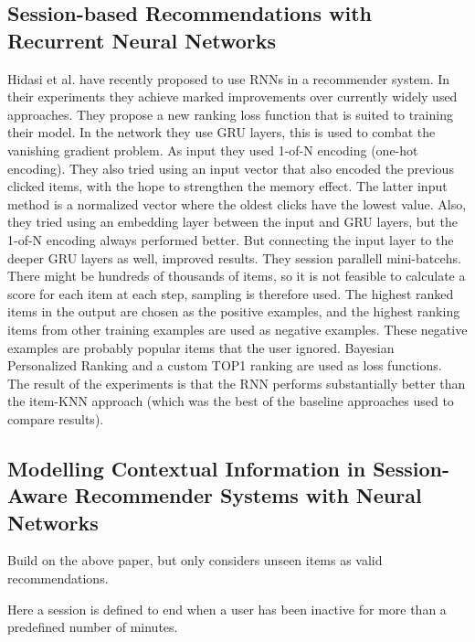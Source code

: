 \subsection{Session-based Recommendations with Recurrent Neural Networks}
Hidasi et al. \cite{DBLP:journals/corr/HidasiKBT15} have recently proposed to use RNNs in a recommender system. In their experiments they achieve marked improvements over currently widely used approaches. They propose a new ranking loss function that is suited to training their model. In the network they use GRU layers, this is used to combat the vanishing gradient problem. As input they used 1-of-N encoding (one-hot encoding). They also tried using an input vector that also encoded the previous clicked items, with the hope to strengthen the memory effect. The latter input method is a normalized vector where the oldest clicks have the lowest value. Also, they tried using an embedding layer between the input and GRU layers, but the 1-of-N encoding always performed better. But connecting the input layer to the deeper GRU layers as well, improved results. They session parallell mini-batcehs. 
There might be hundreds of thousands of items, so it is not feasible to calculate a score for each item at each step, sampling is therefore used. The highest ranked items in the output are chosen as the positive examples, and the highest ranking items from other training examples are used as negative examples. These negative examples are probably popular items that the user ignored. Bayesian Personalized Ranking and a custom TOP1 ranking are used as loss functions.
The result of the experiments is that the RNN performs substantially better than the item-KNN approach (which was the best of the baseline approaches used to compare results).


\subsection{Modelling Contextual Information in Session-Aware Recommender Systems with Neural Networks}
Build on the above paper, but only considers unseen items as valid recommendations.

Here a session is defined to end when a user has been inactive for more than a predefined number of minutes.


